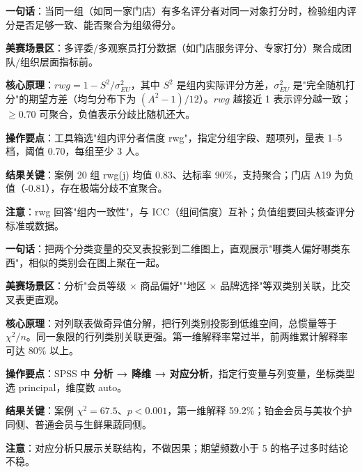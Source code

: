 \begin{algobrief}
\textbf{一句话}：当同一组（如同一家门店）有多名评分者对同一对象打分时，检验组内评分是否足够一致、能否聚合为组级得分。

\textbf{美赛场景区}：多评委/多观察员打分数据（如门店服务评分、专家打分）聚合成团队/组织层面指标前。

\textbf{核心原理}：$rwg = 1 - S^2 / \sigma^2_{EU}$，其中 $S^2$ 是组内实际评分方差，$\sigma^2_{EU}$ 是"完全随机打分"的期望方差（均匀分布下为 $(A^2-1)/12$）。$rwg$ 越接近 1 表示评分越一致；$\geq 0.70$ 可聚合，负值表示分歧比随机还大。

\textbf{操作要点}：工具箱选"组内评分者信度 rwg"，指定分组字段、题项列，量表 1--5 档，阈值 0.70，每组至少 3 人。

\textbf{结果关键}：案例 20 组 rwg(j) 均值 0.83、达标率 90\%，支持聚合；门店 A19 为负值（-0.81），存在极端分歧不宜聚合。

\textbf{注意}：rwg 回答"组内一致性"，与 ICC（组间信度）互补；负值组要回头核查评分标准或数据。
\end{algobrief}


\begin{algobrief}
\textbf{一句话}：把两个分类变量的交叉表投影到二维图上，直观展示"哪类人偏好哪类东西"，相似的类别会在图上聚在一起。

\textbf{美赛场景区}：分析"会员等级 $\times$ 商品偏好""地区 $\times$ 品牌选择"等双类别关联，比交叉表更直观。

\textbf{核心原理}：对列联表做奇异值分解，把行列类别投影到低维空间，总惯量等于 $\chi^2/n$。同一象限的行列类别关联更强。第一维解释率常过半，前两维累计解释率可达 80\% 以上。

\textbf{操作要点}：SPSS 中 \textbf{分析 → 降维 → 对应分析}，指定行变量与列变量，坐标类型选 principal，维度数 auto。

\textbf{结果关键}：案例 $\chi^2=67.5$、$p<0.001$，第一维解释 59.2\%；铂金会员与美妆个护同侧、普通会员与生鲜果蔬同侧。

\textbf{注意}：对应分析只展示关联结构，不做因果；期望频数小于 5 的格子过多时结论不稳。
\end{algobrief}


